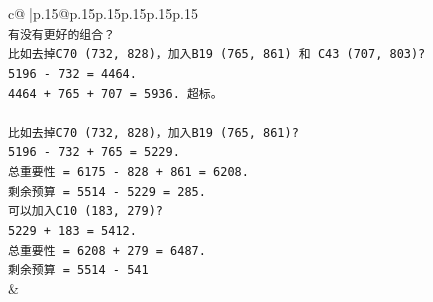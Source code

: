 \documentclass{article}
\begin{document}
{\begin{supertabular}{c@{$\;$}|p{.15\linewidth}@{}p{.15\linewidth}p{.15\linewidth}p{.15\linewidth}p{.15\linewidth}p{.15\linewidth}}
{{{\\ 
\texttt{有没有更好的组合？} \\
\texttt{比如去掉C70 (732, 828)，加入B19 (765, 861) 和 C43 (707, 803)?} \\
\texttt{5196 {-} 732 = 4464.} \\
\texttt{4464 + 765 + 707 = 5936. 超标。} \\
\\ 
\texttt{比如去掉C70 (732, 828)，加入B19 (765, 861)?} \\
\texttt{5196 {-} 732 + 765 = 5229.} \\
\texttt{总重要性 = 6175 {-} 828 + 861 = 6208.} \\
\texttt{剩余预算 = 5514 {-} 5229 = 285.} \\
\texttt{可以加入C10 (183, 279)?} \\
\texttt{5229 + 183 = 5412.} \\
\texttt{总重要性 = 6208 + 279 = 6487.} \\
\texttt{剩余预算 = 5514 {-} 541} \\
            }
        }
    }
    & \\ \\


\end{supertabular}}
\end{document}
